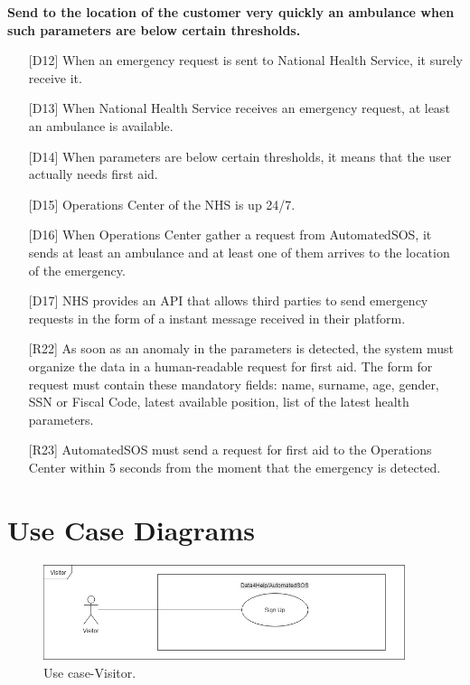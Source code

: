 \begin{enumerate} [resume, label={\bf[G\arabic*]}]
    \item \textbf{Send to the location of the customer very quickly an ambulance when such parameters are below certain thresholds.}
        \begin{itemize}
            \item [{[D12]}] When an emergency request is sent to National Health Service, it surely receive it.
            \item [{[D13]}] When National Health Service receives an emergency request, at least an ambulance is available.
            \item [{[D14]}] When  parameters  are  below  certain  thresholds,  it  means  that  the  user actually needs first aid.
            \item [{[D15]}] Operations Center of the NHS is up 24/7.
            \item [{[D16]}] When Operations Center gather a request from AutomatedSOS, it sends at least an ambulance and at least one of them arrives to the location of the emergency.
            \item [{[D17]}] NHS provides an API that allows third parties to send emergency requests in the form of a instant message received in their platform.
            \item [{[R22]}] As soon as an anomaly in the parameters is detected, the system must organize the data in a human-readable request for first aid. The form for request must contain these mandatory fields: name, surname, age, gender, SSN or Fiscal Code, latest available position, list of the latest health parameters.
            \item [{[R23]}] AutomatedSOS must send a request for first aid to the Operations Center within 5 seconds from the moment that the emergency is detected.
        \end{itemize}
\end{enumerate}


\section{Use Case Diagrams}
\begin{figure}[ht]
    \setcounter{figure}{0}
    \renewcommand{\thefigure}{\alph{figure}}
    \centering
    \captionsetup{labelformat=parens, labelsep=space, name=}
    \includegraphics[width = 300pt]{images/Use-case/UCVisitor.jpg}
    \caption{Use case-Visitor.}
\end{figure}


